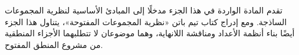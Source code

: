 \documentclass[../../include/open-logic-part]{subfiles}
\begin{document}

\begin{editorial}
  تقدم المادة الواردة في هذا الجزء مدخلًا إلى المبادئ الأساسية لنظرية
  المجموعات الساذجة. ومع إدراج كتاب تيم باتن «نظرية المجموعات المفتوحة»،
  يتناول هذا الجزء أيضًا بناء أنظمة الأعداد ومناقشة اللانهاية، وهما موضوعان
  لا تتطلبهما الأجزاء المنطقية من مشروع المنطق المفتوح.
\end{editorial}







\OLEndPartHook
\end{document}
